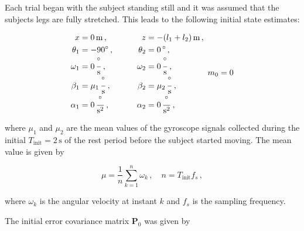 Each trial began with the subject standing still and it was assumed that the subjects legs are fully stretched. This leads to the following initial state estimates:

\begin{equation}
\begin{matrix}
	\begin{split}
	  x &= 0\,\mbox{m}\,, \\
	  \theta_1 &= -90^{\circ}\,, \\
	  \omega_1 &= 0\,\frac{^{\circ}}{\mbox{s}}\,, \\
	  \beta_1 &= \mu_1\,\frac{^{\circ}}{\mbox{s}}\,, \\
	  \alpha_1 &= 0\,\frac{^{\circ}}{\mbox{s}^2}\,, 
\end{split} \qquad \quad
    \begin{split}
   	  z &= -(l_1+l_2)\,\mbox{m}\,, \\
	  \theta_2 &= 0\,^{\circ}\,, \mathrel{\phantom{90^{\circ}}}\\
	  \omega_2 &= 0\,\frac{^{\circ}}{\mbox{s}}\,, \\
	  \beta_2 &= \mu_2\,\frac{^{\circ}}{\mbox{s}}\,, \\
	  \alpha_2 &= 0\,\frac{^{\circ}}{\mbox{s}^2}\,,  
\end{split}
\end{matrix} \\
	  m_0 = 0
\end{equation}

\noindent
where $\mu_1$ and $\mu_2$ are the mean values of the gyroscope signals collected during the initial $T_{\text{init}} = 2\,\mbox{s}$ of the rest period before the subject started moving. The mean value is given by

\begin{equation}
  \mu = \frac{1}{n} \sum_{k=1}^{n}{\omega_k}\,, \quad n = T_{\text{init}} f_s\,,
\end{equation}

\noindent
where $\omega_k$ is the angular velocity at instant $k$ and $f_s$ is the sampling frequency.

The initial error covariance matrix $\mathbf{P}_{0}$ was given by

